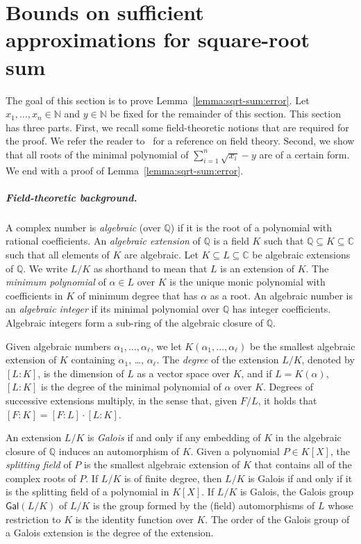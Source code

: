 \documentclass[a4paper,UKenglish,cleveref,autoref,thm-restate,colorlinks]{lipics-v2021}
\newcommand{\sqsx}{x} \newcommand{\sqsxVect}{\bar{x}} \newcommand{\sqsm}{m} \newcommand{\sqsy}{y} \newcommand{\sqsi}{i} \newcommand{\sqsn}{n} \newcommand{\sqsSize}{E}
\newcommand{\IN}{\mathbb{N}}
\newcommand{\IQ}{\mathbb{Q}}
\newcommand{\IC}{\mathbb{C}}
\newcommand{\indexPosition}{\ell}
\begin{document}
 


\newpage

\appendix

\section{Bounds on sufficient approximations for square-root sum}\label{appendix:square root sum}
The goal of this section is to prove Lemma~\ref{lemma:sqrt-sum:error}.
Let $\sqsx_1, \ldots, \sqsx_\sqsn\in\IN$ and $\sqsy\in\IN$ be fixed for the remainder of this section.
This section has three parts.
First, we recall some field-theoretic notions that are required for the proof.
We refer the reader to~\cite{lang2012algebra} for a reference on field theory.
Second, we show that all roots of the minimal polynomial of $\sum_{\sqsi=1}^\sqsn\sqrt{\sqsx_\sqsi}-\sqsy$ are of a certain form.
We end with a proof of Lemma~\ref{lemma:sqrt-sum:error}.

\subparagraph*{Field-theoretic background.}
A complex number is \textit{algebraic} (over $\IQ$) if it is the root of a polynomial with rational coefficients.
An \textit{algebraic extension} of $\IQ$ is a field $K$ such that $\IQ\subseteq K\subseteq\IC$ such that all elements of $K$ are algebraic.
Let $K\subseteq L\subseteq\IC$ be algebraic extensions of $\IQ$.
We write $L/K$ as shorthand to mean that $L$ is an extension of $K$.
The \textit{minimum polynomial} of $\alpha\in L$ over $K$ is the unique monic polynomial with coefficients in $K$ of minimum degree that has $\alpha$ as a root.
An algebraic number is an \textit{algebraic integer} if its minimal polynomial over $\IQ$ has integer coefficients.
Algebraic integers form a sub-ring of the algebraic closure of $\IQ$.

Given algebraic numbers $\alpha_1, \ldots, \alpha_\indexPosition$, we let $K(\alpha_1, \ldots, \alpha_\indexPosition)$ be the smallest algebraic extension of $K$ containing $\alpha_1$, \ldots, $\alpha_\indexPosition$.
The \textit{degree} of the extension $L/K$, denoted by $[L:K]$, is the dimension of $L$ as a vector space over $K$, and if $L = K(\alpha)$, $[L:K]$ is the degree of the minimal polynomial of $\alpha$ over $K$.
Degrees of successive extensions multiply, in the sense that, given $F/L$, it holds that $[F:K] = [F:L]\cdot [L:K]$.

An extension $L/K$ is \textit{Galois} if and only if any embedding of $K$ in the algebraic closure of $\IQ$ induces an automorphism of $K$.
Given a polynomial $P\in K[X]$, the \textit{splitting field} of $P$ is the smallest algebraic extension of $K$ that contains all of the complex roots of $P$.
If $L/K$ is of finite degree, then $L/K$ is Galois if and only if it is the splitting field of a polynomial in $K[X]$.
If $L/K$ is Galois, the Galois group $\mathsf{Gal}(L/K)$ of $L/K$ is the group formed by the (field) automorphisms of $L$ whose restriction to $K$ is the identity function over $K$.
The order of the Galois group of a Galois extension is the degree of the extension.
\end{document}

